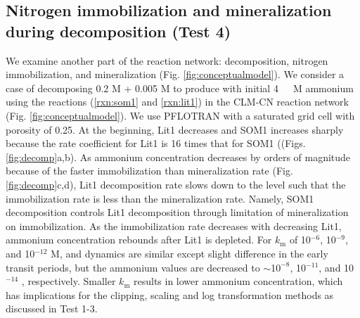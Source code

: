 \documentclass[gmd, manuscript]{copernicus}
\begin{document}
\subsection{Nitrogen immobilization and mineralization during decomposition (Test 4)}
We examine another part of the reaction network: decomposition, nitrogen
immobilization, and mineralization (Fig.  \ref{fig:conceptualmodel}). We
consider a case of decomposing 0.2 \unit{M}  + 0.005 \unit{M}
 to produce  with initial 4 \unit{\mu\,M} ammonium using
the reactions (\ref{rxn:som1} and \ref{rxn:lit1}) in the CLM-CN
reaction network (Fig. \ref{fig:conceptualmodel}). We use PFLOTRAN with a
saturated grid cell with porosity of 0.25. 
At the beginning, Lit1 decreases and SOM1 increases sharply because the rate
coefficient for Lit1 is 16 times that for SOM1 ((Figs. \ref{fig:decomp}a,b). As
ammonium concentration decreases by orders of magnitude because of the faster
immobilization than mineralization rate (Fig. \ref{fig:decomp}c,d), Lit1
decomposition rate slows down to the level such  that the immobilization rate
is less than the mineralization rate. Namely, SOM1 decomposition controls Lit1
decomposition through limitation of mineralization on immobilization. As the
immobilization rate decreases with decreasing Lit1, ammonium concentration
rebounds after Lit1 is depleted. For $k_\text{m}$ of 10$^{-6}$, 10$^{-9}$, and
10$^{-12}$ M,  and  dynamics are similar except slight
difference in the early transit periods, but the ammonium values are decreased
to $\sim$1$0^{-8}$, 10$^{-11}$, and 10$^{-14}$ , respectively. Smaller
$k_\text{m}$ results in lower ammonium concentration, which has implications
for the clipping, scaling and log transformation methods as discussed in Test
1-3. 
\end{document}
